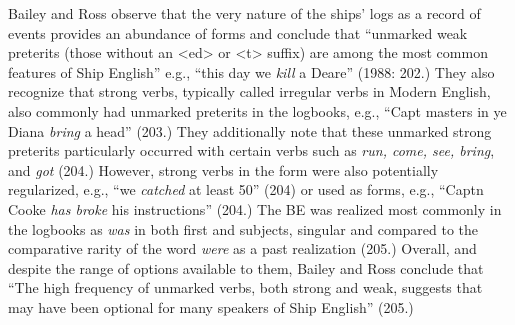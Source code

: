 Bailey and Ross observe that the very nature of the ships’ logs as a record of events provides an abundance of  forms and conclude that “unmarked weak preterits (those without an <ed> or <t> suffix) are among the most common features of Ship English” e.g., “this day we \textit{kill} a Deare” (1988: 202.) They also recognize that strong verbs, typically called irregular verbs in Modern English, also commonly had unmarked preterits in the logbooks, e.g., “Capt masters in ye Diana \textit{bring} a head” (203.) They additionally note that these unmarked strong preterits particularly occurred with certain verbs such as \textit{run, come, see, bring}, and \textit{got} (204.) However, strong verbs in the  form were also potentially regularized, e.g., “we \textit{catched} at least 50” (204) or used as  forms, e.g., “Captn Cooke \textit{has broke} his instructions” (204.) The  BE was realized most commonly in the logbooks as \textit{was} in both first and  subjects, singular and  compared to the comparative rarity of the word \textit{were} as a past realization (205.) Overall, and despite the range of options available to them, Bailey and Ross conclude that “The high frequency of unmarked verbs, both strong and weak, suggests that  may have been optional for many speakers of Ship English” (205.) 

